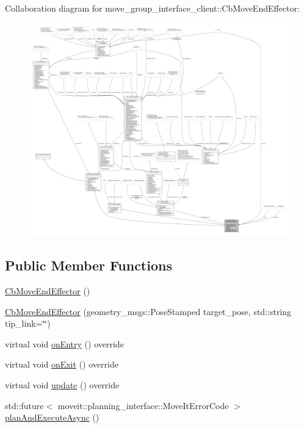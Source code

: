 Collaboration diagram for move\+\_\+group\+\_\+interface\+\_\+client\+:\+:Cb\+Move\+End\+Effector\+:
\nopagebreak
\begin{figure}[H]
\begin{center}
\leavevmode
\includegraphics[width=350pt]{classmove__group__interface__client_1_1CbMoveEndEffector__coll__graph}
\end{center}
\end{figure}
\subsection*{Public Member Functions}
\begin{DoxyCompactItemize}
\item 
\hyperlink{classmove__group__interface__client_1_1CbMoveEndEffector_af099daf41522868d1ad8e9c9cf4f73e3}{Cb\+Move\+End\+Effector} ()
\item 
\hyperlink{classmove__group__interface__client_1_1CbMoveEndEffector_a2c04d1059de71a90b87cb23b8de2a45d}{Cb\+Move\+End\+Effector} (geometry\+\_\+msgs\+::\+Pose\+Stamped target\+\_\+pose, std\+::string tip\+\_\+link=\char`\"{}\char`\"{})
\item 
virtual void \hyperlink{classmove__group__interface__client_1_1CbMoveEndEffector_acd7f50c949fcf6e7c56b285439b0b1de}{on\+Entry} () override
\item 
virtual void \hyperlink{classmove__group__interface__client_1_1CbMoveEndEffector_a5dae0057f6f89fd99288e802cc37b07d}{on\+Exit} () override
\item 
virtual void \hyperlink{classmove__group__interface__client_1_1CbMoveEndEffector_ab3c060e0e4f2152d8c1234bbcca55476}{update} () override
\item 
std\+::future$<$ moveit\+::planning\+\_\+interface\+::\+Move\+It\+Error\+Code $>$ \hyperlink{classmove__group__interface__client_1_1CbMoveEndEffector_a1d01b53676a8066f726c59a96a9fe107}{plan\+And\+Execute\+Async} ()
\end{DoxyCompactItemize}
